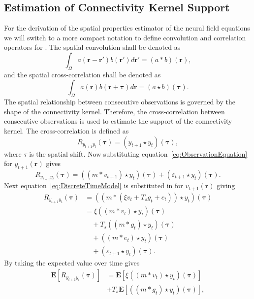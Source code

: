 \documentclass[conference,onecolumn]{IEEEtran}
\begin{document}
\subsection{Estimation of Connectivity Kernel Support}
For the derivation of the spatial properties estimator of the neural field equations we will switch to a more compact notation to define convolution and correlation operators for . The spatial convolution shall be denoted as
\begin{equation}
	\int_\Omega a(\mathbf{r}-\mathbf{r}')b(\mathbf{r}')d\mathbf{r}' = (a\ast b)(\mathbf{r}),
\end{equation}
and the spatial cross-correlation shall be denoted as 
\begin{equation}
	\int_\Omega a(\mathbf{r})b(\mathbf{r}+\boldsymbol{\tau})d\mathbf{r} = (a\star b)(\boldsymbol{\tau}).
\end{equation} 
The spatial relationship between consecutive observations is governed by the shape of the connectivity kernel. Therefore, the cross-correlation between consecutive observations is used to estimate the support of the connectivity kernel. The cross-correlation is defined as
\begin{equation}
	R_{y_{t+1}y_t}(\boldsymbol{\tau}) = (y_{t+1}\star y_t)(\boldsymbol{\tau}),
\end{equation}
where $\tau$ is the spatial shift. Now substituting equation~\ref{eq:ObservationEquation} for $y_{t+1}(\mathbf{r})$ gives 
\begin{equation}
	R_{y_{t+1}y_t}(\boldsymbol{\tau}) = ((m \ast v_{t+1})\star y_t)(\boldsymbol{\tau}) + (\varepsilon_{t+1} \star y_t)(\boldsymbol{\tau}).
\end{equation}
Next equation~\ref{eq:DiscreteTimeModel} is substituted in for $v_{t+1}(\mathbf{r})$ giving 
\begin{align}
	R_{y_{t+1}y_t}(\boldsymbol{\tau}) &= (\left(m \ast \left(\xi v_t +  T_s g_t + e_t\right)\right) \star y_t)(\boldsymbol{\tau})\\
	&= \xi\left(\left(m \ast v_t\right) \star y_t \right)(\boldsymbol{\tau}) \nonumber\\
	&\quad+ T_s \left(\left(m\ast g_t\right)\star y_t \right)(\boldsymbol{\tau}) \nonumber\\
	&\quad+ \left(\left(m\ast e_t\right)\star y_t \right)(\boldsymbol{\tau}) \nonumber\\
	&\quad+ (\varepsilon_{t+1} \star y_t)(\boldsymbol{\tau}).
\end{align}
By taking the expected value over time gives
\begin{align}
	\mathbf{E}[R_{y_{t+1}y_t}(\boldsymbol{\tau})] &= \mathbf{E}[\xi\left(\left(m \ast v_t\right) \star y_t \right)(\boldsymbol{\tau})] \nonumber \\
	 &+ T_s \mathbf{E}[\left(\left(m\ast g_t\right)\star y_t \right)(\boldsymbol{\tau})],
\end{align}
\end{document}
